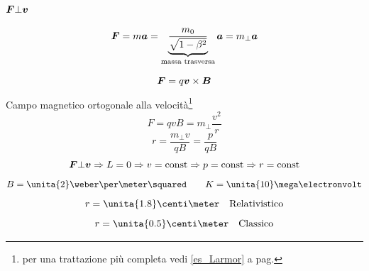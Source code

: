\subsubsection{$\boldsymbol{F}\bot\boldsymbol{v}$}
\begin{equation*}\boldsymbol{F}=m\boldsymbol{a}=\underbrace{\frac{m_0}{\sqrt{1-\beta^2}}}_\text{massa trasversa}\boldsymbol{a}=m_\perp \boldsymbol{a}\end{equation*}
\begin{Es}
\begin{equation*}\boldsymbol{F}=q\boldsymbol{v}\times\boldsymbol{B}\end{equation*}
Campo magnetico ortogonale alla velocità\footnote{per una trattazione più completa vedi \ref{es_Larmor} a pag.\@\pageref{es_Larmor}}
\begin{equation*}F=qvB=m_\bot\frac{v^2}{r}\end{equation*}
\begin{equation*}r=\frac{m_\bot v}{qB}=\frac{p}{qB}\end{equation*}
\begin{equation*}\boldsymbol{F}\bot \boldsymbol{v}\Rightarrow L=0\Rightarrow v=\text{const}\Rightarrow p=\text{const}\Rightarrow r=\text{const}\end{equation*}
\begin{equation*}B=\unita{2}\weber\per\meter\squared\qquad K=\unita{10}\mega\electronvolt\end{equation*}
\begin{equation*}r=\unita{1.8}\centi\meter \quad\text{Relativistico}\end{equation*}
\begin{equation*}r=\unita{0.5}\centi\meter \quad\text{Classico}\end{equation*}
\end{Es}


\pagebreak
